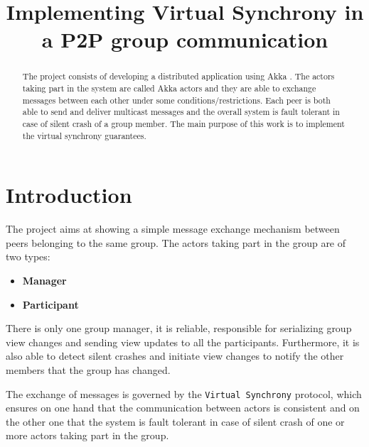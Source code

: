 \documentclass[conference]{IEEEtran}
\begin{document}
\title{Implementing Virtual Synchrony in a P2P group communication}

\author{
}

\maketitle

\begin{abstract}
The project consists of developing a distributed application using Akka \cite{Akka}. The actors taking part in the system are called Akka actors and they are able to exchange messages between each other under some conditions/restrictions. Each peer is both able to send and deliver multicast messages and the overall system is fault tolerant in case of silent crash of a group member. The main purpose of this work is to implement the virtual synchrony guarantees.

\end{abstract}

\section{Introduction}
\label{sec:introduction}
The project aims at showing a simple message exchange mechanism between
peers belonging to the same group. The actors taking part in the group
are of two types:
\begin{itemize}
	\item \textbf{Manager}
	\item \textbf{Participant}
\end{itemize} 
There is only one group manager, it is reliable, responsible for serializing group view
changes and sending view updates to all the participants. Furthermore, it is also able to detect silent crashes and initiate view changes to notify the other members that the group has changed.

The exchange of messages is governed by the \texttt{Virtual Synchrony} protocol, which ensures on one hand that the communication between actors is consistent and on the other one that the system is fault tolerant in case of silent crash of one or more actors taking part in the group.
\end{document}
